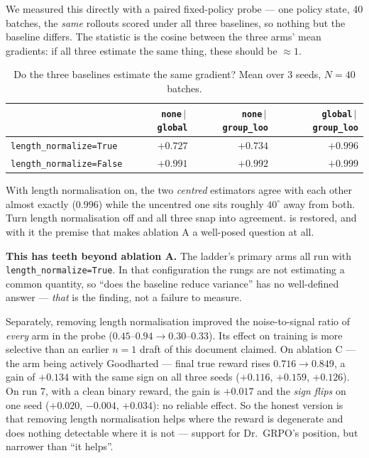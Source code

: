 \documentclass[11pt,letterpaper]{article}
\theoremstyle{definition}
\begin{document}
We measured this directly with a paired fixed-policy probe --- one policy state, 40 batches, the
\emph{same} rollouts scored under all three baselines, so nothing but the baseline differs. The
statistic is the cosine between the three arms' mean gradients: if all three estimate the same thing,
these should be $\approx 1$.

\begin{table}[H]
\centering
\caption{Do the three baselines estimate the same gradient? Mean over 3 seeds, $N=40$ batches.}
\label{tab:lennorm}
\small
\begin{tabular}{@{}lrrr@{}}
\toprule
 & \texttt{none}\,$|$\,\texttt{global} & \texttt{none}\,$|$\,\texttt{group\_loo} & \texttt{global}\,$|$\,\texttt{group\_loo} \\
\midrule
\texttt{length\_normalize=True}  & $+0.727$ & $+0.734$ & $+0.996$ \\
\texttt{length\_normalize=False} & $\mathbf{+0.991}$ & $\mathbf{+0.992}$ & $+0.999$ \\
\bottomrule
\end{tabular}
\end{table}

With length normalisation on, the two \emph{centred} estimators agree with each other almost exactly
($0.996$) while the uncentred one sits roughly $40^\circ$ away from both. Turn length normalisation
off and all three snap into agreement.  is restored, and with it the premise that
makes ablation A a well-posed question at all.

\begin{aside}
\textbf{This has teeth beyond ablation A.} The ladder's primary arms all run with
\texttt{length\_normalize=True}. In that configuration the rungs are not estimating a common quantity,
so ``does the baseline reduce variance'' has no well-defined answer --- \emph{that} is the finding,
not a failure to measure.

Separately, removing length normalisation improved the noise-to-signal ratio of \emph{every} arm in
the probe ($0.45$--$0.94 \to 0.30$--$0.33$). Its effect on training is more selective than an earlier
$n=1$ draft of this document claimed. On ablation C --- the arm being actively Goodharted --- final
true reward rises $0.716 \to 0.849$, a gain of $+0.134$ with the same sign on all three seeds
($+0.116$, $+0.159$, $+0.126$). On run 7, with a clean binary reward, the gain is $+0.017$ and the
\emph{sign flips} on one seed ($+0.020$, $-0.004$, $+0.034$): no reliable effect. So the honest
version is that removing length normalisation helps where the reward is degenerate and does nothing
detectable where it is not --- support for Dr.\ GRPO's position, but narrower than ``it helps''.
\end{aside}
\end{document}
